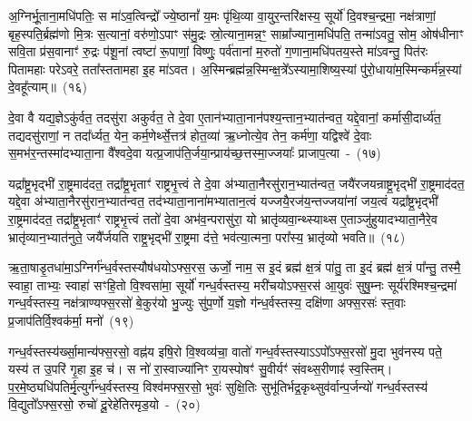 अ॒ग्निर्भू॒ताना॒मधि॑\-पतिः॒ स मा॑\-ऽव॒त्विन्द्रो᳚ ज्ये॒ष्ठानां᳚ य॒मः पृ॑थि॒व्या वा॒युर॒न्त\-रि॑क्षस्य॒ सूर्यो॑ दि॒वश्च॒न्द्रमा॒ नक्ष॑त्राणां॒ बृह॒स्पति॒र्ब्रह्म॑णो मि॒त्रः स॒त्यानां॒ वरु॑णो॒\-ऽपाꣳ स॑मु॒द्रः स्रो॒त्याना॒मन्न॒ꣳ॒ साम्रा᳚ज्याना॒मधि॑\-पति॒ तन्मा॑\-ऽवतु॒ सोम॒ ओष॑धीनाꣳ सवि॒ता प्र॑स॒वानाꣳ॑ रु॒द्रः प॑शू॒नां त्वष्टा॑ रू॒पाणां॒ विष्णुः॒ पर्व॑तानां म॒रुतो॑ ग॒णाना॒मधि॑पतय॒स्ते मा॑\-ऽवन्तु॒ पित॑रः पितामहाः परे\-ऽवरे॒ तता᳚स्ततामहा इ॒ह मा॑\-ऽवत। अ॒स्मिन्ब्रह्म॑न्न॒स्मिन्क्ष॒त्रे᳚\-ऽस्यामा॒शिष्य॒स्यां पु॑रो॒धाया॑\-म॒स्मिन्कर्म॑न्न॒स्यां दे॒वहू᳚त्याम्॥~(१६)

{\anuvakamend[{अ॒व॒रे॒ स॒प्तद॑श च}]}%

दे॒वा वै यद्य॒ज्ञे\-ऽकु॑र्वत॒ तदसु॑रा अकुर्वत॒ ते दे॒वा ए॒तान॑भ्याता॒नान॑पश्य॒न्तान॒भ्यात॑न्वत॒ यद्दे॒वानां॒ कर्मासी॒दार्ध्य॑त॒ तद्यदसु॑राणां॒ न तदा᳚र्ध्यत॒ येन॒ कर्म॒णेर्थ्से॒त्तत्र॑ होत॒व्या॑ ऋ॒ध्नोत्ये॒व तेन॒ कर्म॑णा॒ यद्विश्वे॑ दे॒वाः स॒मभ॑र॒न्तस्मा॑दभ्याता॒ना वै᳚श्वदे॒वा यत्प्र॒जा\-प॑ति॒र्जया॒न्प्राय॑च्छ॒त्तस्मा॒ज्जयाः᳚ प्राजाप॒त्या~-~(१७)

यद्रा᳚ष्ट्र॒भृद्भी॑ रा॒ष्ट्रमाद॑दत॒ तद्रा᳚ष्ट्र॒भृताꣳ॑ राष्ट्रभृ॒त्त्वं ते दे॒वा अ॑भ्याता॒नैरसु॑रान॒भ्यात॑न्वत॒ जयै॑रजयन्राष्ट्र॒भृद्भी॑ रा॒ष्ट्रमाद॑दत॒ यद्दे॒वा अ॑भ्याता॒नैरसु॑रान॒भ्यात॑न्वत॒ तद॑भ्याता॒नाना॑मभ्यातान॒त्वं यज्जयै॒रज॑य॒न्तज्जया॑नां जय॒त्वं यद्रा᳚ष्ट्र॒भृद्भी॑ रा॒ष्ट्रमाद॑दत॒ तद्रा᳚ष्ट्र॒भृताꣳ॑ राष्ट्रभृ॒त्त्वं ततो॑ दे॒वा अभ॑व॒न्परासु॑रा॒ यो भ्रातृ॑व्यवा॒न्थ्स्याथ्स ए॒ताञ्जु॑हुयादभ्याता॒नैरे॒व भ्रातृ॑व्यान॒भ्यात॑नुते॒ जयै᳚र्जयति राष्ट्र॒भृद्भी॑ रा॒ष्ट्रमा द॑त्ते॒ भव॑त्या॒त्मना॒ परा᳚स्य॒ भ्रातृ॑व्यो भवति॥~(१८)

{\anuvakamend[{प्रा॒जा॒प॒त्याः सो᳚\-ऽष्टाद॑श च}]}%

ऋ॒ता॒षाडृ॒तधा॑मा॒\-ऽग्निर्ग॑न्ध॒र्वस्तस्यौष॑धयो\-ऽफ्स॒रस॒ ऊर्जो॒ नाम॒ स इ॒दं ब्रह्म॑ क्ष॒त्रं पा॑तु॒ ता इ॒दं ब्रह्म॑ क्ष॒त्रं पा᳚न्तु॒ तस्मै॒ स्वाहा॒ ताभ्यः॒ स्वाहा॑ सꣳहि॒तो वि॒श्वसा॑मा॒ सूर्यो॑ गन्ध॒र्वस्तस्य॒ मरी॑चयो\-ऽफ्स॒रस॑ आ॒युवः॑ सुषु॒म्नः सूर्य॑रश्मिश्च॒न्द्रमा॑ गन्ध॒र्वस्तस्य॒ नक्ष॑त्राण्यफ्स॒रसो॑ बे॒कुर॑यो भु॒ज्युः सु॑प॒र्णो य॒ज्ञो ग॑न्ध॒र्वस्तस्य॒ दक्षि॑णा अफ्स॒रसः॑ स्त॒वाः प्र॒जा\-प॑तिर्वि॒श्वक॑र्मा॒ मनो॑~(१९)

गन्ध॒र्वस्तस्य॑र्ख्सा॒मान्य॑फ्स॒रसो॒ वह्न॑य इषि॒रो वि॒श्वव्य॑चा॒ वातो॑ गन्ध॒र्वस्तस्या\-ऽऽ\-पो᳚\-ऽफ्स॒रसो॑ मु॒दा भुव॑नस्य पते॒ यस्य॑ त उ॒परि॑ गृ॒हा इ॒ह च॑। स नो॑ रा॒स्वाज्या॑निꣳ रा॒यस्पोषꣳ॑ सु॒वीर्यꣳ॑ संवथ्स॒रीणाꣴ॑ स्व॒स्तिम्। प॒र॒मे॒ष्ठ्यधि॑\-पति\-र्मृ॒त्युर्ग॑न्ध॒र्वस्तस्य॒ विश्व॑मफ्स॒रसो॒ भुवः॑ सुक्षि॒तिः सुभू॑तिर्भद्र॒कृथ्सुव॑र्वान्प॒र्जन्यो॑ गन्ध॒र्वस्तस्य॑ वि॒द्युतो᳚\-ऽफ्स॒रसो॒ रुचो॑ दू॒रेहे॑तिरमृड॒यो~-~(२०)

